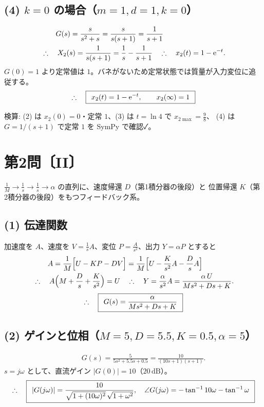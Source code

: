 \documentclass[11pt,a4paper]{article}
\begin{document}
\subsection*{(4) $k=0$ の場合（$m=1,d=1,k=0$）}
\begin{align*}
  &\qquad G(s)=\frac{s}{s^2+s}=\frac{s}{s(s+1)}=\frac{1}{s+1}\\
  &\therefore\quad X_2(s)=\frac{1}{s(s+1)}=\frac1s-\frac{1}{s+1}
   \quad\therefore\quad x_2(t)=1-\mathrm{e}^{-t}.
\end{align*}
$G(0)=1$ より定常値は $1$。バネがないため定常状態では質量が入力変位に追従する。
\[
  \therefore\quad \boxed{\,\;x_2(t)=1-\mathrm{e}^{-t},\qquad x_2(\infty)=1\;\,}
\]

\bigskip
\noindent 検算: (2) は $x_2(0)=0$・定常 $1$、(3) は $t=\ln4$ で $x_{2\max}=\tfrac98$、
(4) は $G=1/(s+1)$ で定常 $1$ を SymPy で確認✓。

\newpage
\section*{第2問〔II〕}

$\frac1M\to\frac1s\to\frac1s\to\alpha$ の直列に、速度帰還 $D$（第1積分器の後段）と
位置帰還 $K$（第2積分器の後段）をもつフィードバック系。

\subsection*{(1) 伝達関数}
加速度を $A$、速度を $V=\frac1s A$、変位 $P=\frac{A}{s^2}$、出力 $Y=\alpha P$ とすると
\begin{align*}
  &\qquad A=\frac1M\Bigl[U-KP-DV\Bigr]
   =\frac1M\Bigl[U-\frac{K}{s^2}A-\frac{D}{s}A\Bigr]\\
  &\therefore\quad A\Bigl(M+\frac{D}{s}+\frac{K}{s^2}\Bigr)=U
   \quad\therefore\quad Y=\frac{\alpha}{s^2}A=\frac{\alpha\,U}{Ms^2+Ds+K}.
\end{align*}
\[
  \therefore\quad \boxed{\,\;G(s)=\dfrac{\alpha}{Ms^2+Ds+K}\;\,}
\]

\subsection*{(2) ゲインと位相（$M=5,D=5.5,K=0.5,\alpha=5$）}
\begin{align*}
  &\qquad G(s)=\frac{5}{5s^2+5.5s+0.5}=\frac{10}{(10s+1)(s+1)}.
\end{align*}
$s=j\omega$ として、直流ゲイン $|G(0)|=10$（$20\,\mathrm{dB}$）。
\[
  \therefore\quad \boxed{\,\;|G(j\omega)|=\dfrac{10}{\sqrt{1+(10\omega)^2}\,\sqrt{1+\omega^2}},\quad
  \angle G(j\omega)=-\tan^{-1}10\omega-\tan^{-1}\omega\;\,}
\]
\end{document}
